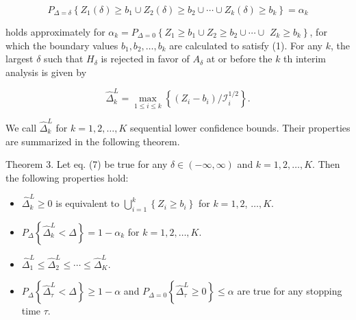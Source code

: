 \documentclass[10pt]{article}
\begin{document}
\begin{equation*}
P_{\Delta=\delta}\left\{Z_{1}(\delta) \geq b_{1} \cup Z_{2}(\delta) \geq b_{2} \cup \cdots \cup Z_{k}(\delta) \geq b_{k}\right\}=\alpha_{k} \tag{7}
\end{equation*}


holds approximately for $\alpha_{k}=P_{\Delta=0}\left\{Z_{1} \geq b_{1} \cup Z_{2} \geq b_{2} \cup \cdots \cup\right.$ $\left.Z_{k} \geq b_{k}\right\}$, for which the boundary values $b_{1}, b_{2}, \ldots, b_{k}$ are calculated to satisfy (1). For any $k$, the largest $\delta$ such that $H_{\delta}$ is rejected in favor of $A_{\delta}$ at or before the $k$ th interim analysis is given by


\begin{equation*}
\hat{\Delta}_{k}^{L}=\max _{1 \leq i \leq k}\left\{\left(Z_{i}-b_{i}\right) / \mathcal{I}_{i}^{1 / 2}\right\} . \tag{8}
\end{equation*}


We call $\hat{\Delta}_{k}^{L}$ for $k=1,2, \ldots, K$ sequential lower confidence bounds. Their properties are summarized in the following theorem.

Theorem 3. Let eq. (7) be true for any $\delta \in(-\infty, \infty)$ and $k=1,2, \ldots, K$. Then the following properties hold:

\begin{itemize}
  \item[a.] $\hat{\Delta}_{k}^{L} \geq 0$ is equivalent to $\bigcup_{i=1}^{k}\left\{Z_{i} \geq b_{i}\right\}$ for $k=1,2$, $\ldots, K$.
  \item[b.] $P_{\Delta}\left\{\hat{\Delta}_{k}^{L}<\Delta\right\}=1-\alpha_{k}$ for $k=1,2, \ldots, K$.
  \item[c.] $\hat{\Delta}_{1}^{L} \leq \hat{\Delta}_{2}^{L} \leq \cdots \leq \hat{\Delta}_{K}^{L}$.
  \item[d.] $P_{\Delta}\left\{\hat{\Delta}_{\tau}^{L}<\Delta\right\} \geq 1-\alpha$ and $P_{\Delta=0}\left\{\hat{\Delta}_{\tau}^{L} \geq 0\right\} \leq \alpha$ are true for any stopping time $\tau$.
\end{itemize}
\end{document}
